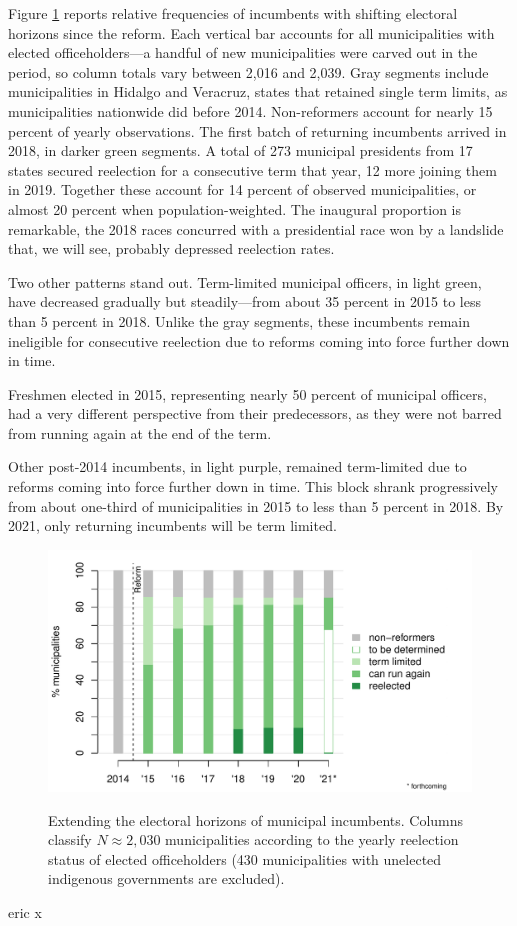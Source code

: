\documentclass[letter,12pt]{article}
\begin{document}
Figure \ref{F:horizons} reports relative frequencies of incumbents with shifting electoral horizons since the reform. Each vertical bar accounts for all municipalities with elected officeholders---a handful of new municipalities were carved out in the period, so column totals vary between 2,016 and 2,039. Gray segments include municipalities in Hidalgo and Veracruz, states that retained single term limits, as municipalities nationwide did before 2014. Non-reformers account for nearly 15 percent of yearly observations. The first batch of returning incumbents arrived in 2018, in darker green segments. A total of 273 municipal presidents from 17 states secured reelection for a consecutive term that year, 12 more joining them in 2019. Together these account for 14 percent of observed municipalities, or almost 20 percent when population-weighted. The inaugural proportion is remarkable, the 2018 races concurred with a presidential race won by a landslide that, we will see, probably depressed reelection rates. 

Two other patterns stand out. Term-limited municipal officers, in light green, have decreased gradually but steadily---from about 35 percent in 2015 to less than 5 percent in 2018. Unlike the gray segments, these incumbents remain ineligible for consecutive reelection due to reforms coming into force further down in time. 

Freshmen elected in 2015, representing nearly 50 percent of municipal officers, had a very different perspective from their predecessors, as they were not barred from running again at the end of the term.  

Other post-2014 incumbents, in light purple, remained term-limited due to reforms coming into force further down in time. This block shrank progressively from about one-third of municipalities in 2015 to less than 5 percent in 2018. By 2021, only returning incumbents will be term limited. 

\begin{figure}
  \centering
  \includegraphics[width=.8\columnwidth]{../graph/horizon-yrs.pdf} \\
  \caption{Extending the electoral horizons of municipal incumbents. Columns classify $N \approx 2,030$ municipalities according to the yearly reelection status of elected officeholders (430 municipalities with unelected indigenous governments are excluded).}\label{F:horizons}
\end{figure}
eric  x
\end{document}
